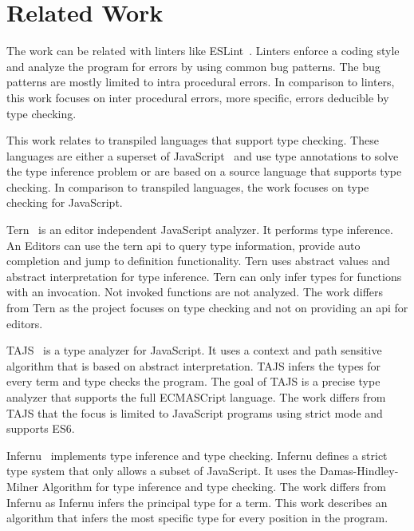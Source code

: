 \section{Related Work}
The work can be related with linters like ESLint~\cite{jQuery2016}. Linters enforce a coding style and analyze the program for errors by using common bug patterns. The bug patterns are mostly limited to intra procedural errors. In comparison to linters, this work focuses on inter procedural errors, more specific, errors deducible by type checking. 

This work relates to transpiled languages that support type checking. These languages are either a superset of JavaScript~\cite{Microsoft2012, Facebook2014} and use type annotations to solve the type inference problem or are based on a source language that supports type checking\cite{Ekblad2012, McKenna}. In comparison to transpiled languages, the work focuses on type checking for JavaScript. 

Tern~\cite{Haverbeke} is an editor independent JavaScript analyzer. It performs type inference. An Editors can use the tern api to query type information, provide auto completion and jump to definition functionality. Tern uses abstract values and abstract interpretation for type inference. Tern can only infer types for functions with an invocation. Not invoked functions are not analyzed. The work differs from Tern as the project focuses on type checking and not on providing an api for editors. 

TAJS~\cite{JensenMollerThiemann2009} is a type analyzer for JavaScript. It uses a context and path sensitive algorithm that is based on abstract interpretation. TAJS infers the types for every term and type checks the program. The goal of TAJS is a precise type analyzer that supports the full ECMASCript language. The work differs from TAJS that the focus is limited to JavaScript programs using strict mode and supports ES6.

Infernu~\cite{Lewis} implements type inference and type checking. Infernu defines a strict type system that only allows a subset of JavaScript. It uses the Damas-Hindley-Milner Algorithm for type inference and type checking. The work differs from Infernu as Infernu infers the principal type for a term. This work describes an algorithm that infers the most specific type for every position in the program. 

